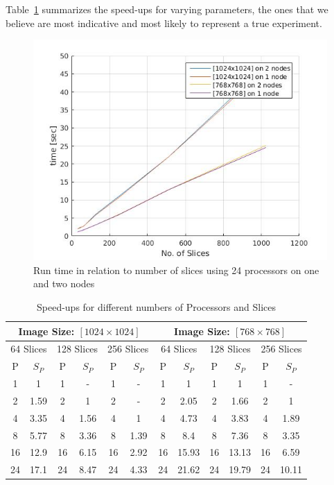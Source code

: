 \documentclass[a4paper,12pt]{article}
\begin{document}
Table~\ref{table_1} summarizes the speed-ups for varying parameters, the ones that we believe are most indicative and most likely to represent a true experiment.

\begin{figure}
  \centering
  \includegraphics[scale=0.8]{nodes_1.jpg}
  \caption{Run time in relation to number of slices using 24 processors on one and two nodes}
  \label{nodes}
\end{figure}

\begin{table}
\centering
\caption{Speed-ups for different numbers of Processors and Slices}\label{table_1}
    \begin{tabular}{|cc|cc|cc||cc|cc|cc|}
    \hline
    \multicolumn{6}{|c||}{Image Size: $[1024 \times 1024]$} & \multicolumn{6}{|c|}{Image Size: $[768 \times 768]$}\\
    \hline
    \multicolumn{2}{|c|}{64 Slices} & \multicolumn{2}{|c|}{128 Slices} & \multicolumn{2}{|c||}{256 Slices} & \multicolumn{2}{|c|}{64 Slices} & \multicolumn{2}{|c|}{128 Slices} & \multicolumn{2}{|c|}{256 Slices} \\
    \hline

    P  & $S_P$ & P  & $S_P$ & P  & $S_P$ & P  & $S_P$ & P  & $S_P$ & P  & $S_P$ \\ \hline
    1  & 1     & 1  & -     & 1  & -     & 1  & 1     & 1  & 1     & 1  & -     \\
    2  & 1.59  & 2  & 1     & 2  & -     & 2  & 2.05  & 2  & 1.66  & 2  & 1     \\
    4  & 3.35  & 4  & 1.56  & 4  & 1     & 4  & 4.73  & 4  & 3.83  & 4  & 1.89  \\
    8  & 5.77  & 8  & 3.36  & 8  & 1.39  & 8  & 8.4   & 8  & 7.36  & 8  & 3.35  \\
    16 & 12.9  & 16 & 6.15  & 16 & 2.92  & 16 & 15.93 & 16 & 13.13 & 16 & 6.59  \\
    24 & 17.1  & 24 & 8.47  & 24 & 4.33  & 24 & 21.62 & 24 & 19.79 & 24 & 10.11 \\ \hline
    \end{tabular}
\end{table}
\end{document}
